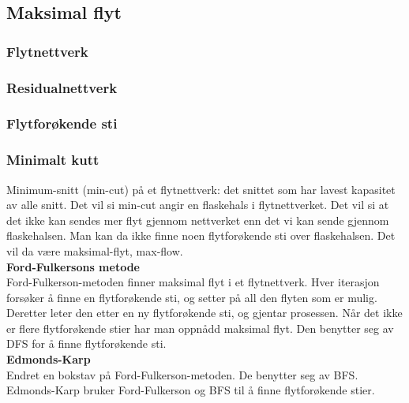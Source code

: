 \subsection{Maksimal flyt}
\subsubsection{Flytnettverk}
\subsubsection{Residualnettverk}
\subsubsection{Flytforøkende sti}
\subsubsection{Minimalt kutt}
Minimum-snitt (min-cut) på et flytnettverk: det snittet som har lavest kapasitet av alle snitt. Det vil si min-cut angir en flaskehals i flytnettverket. Det vil si at det ikke kan sendes mer flyt gjennom nettverket enn det vi kan sende gjennom flaskehalsen. Man kan da ikke finne noen flytforøkende sti over flaskehalsen. Det vil da være maksimal-flyt, max-flow.\\

\noindent \textbf{Ford-Fulkersons metode}\\
Ford-Fulkerson-metoden finner maksimal flyt i et flytnettverk. Hver iterasjon forsøker å finne en flytforøkende sti, og setter på all den flyten som er mulig. Deretter leter den etter en ny flytforøkende sti, og gjentar prosessen. Når det ikke er flere flytforøkende stier har man oppnådd maksimal flyt. Den benytter seg av DFS for å finne flytforøkende sti.
\\

\noindent \textbf{Edmonds-Karp}\\
Endret en bokstav på Ford-Fulkerson-metoden. De benytter seg av BFS. Edmonds-Karp bruker Ford-Fulkerson og BFS til å finne flytforøkende stier.\\